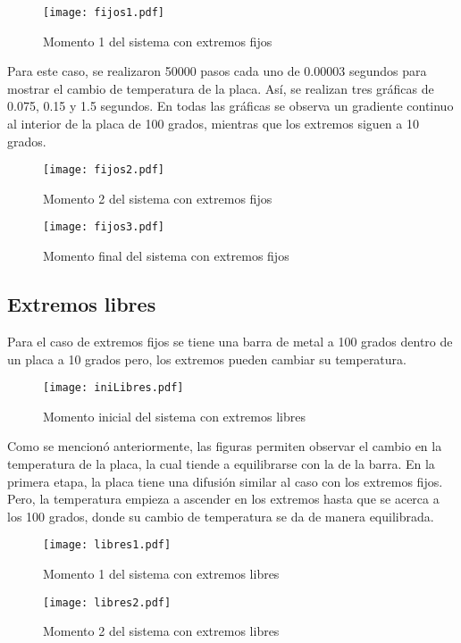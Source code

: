 \documentclass[letterpaper,12pt]{article}
\begin{document}
\begin{figure}[h!]
	\centering
	\caption{Momento 1 del sistema con extremos fijos}
	\texttt{[image: fijos1.pdf]}
\end{figure}

Para este caso, se realizaron 50000 pasos cada uno de 0.00003 segundos para mostrar el cambio de temperatura de la placa. Así, se realizan tres gráficas de 0.075, 0.15 y 1.5 segundos. En todas las gráficas se observa un gradiente continuo al interior de la placa de 100 grados, mientras que los extremos siguen a 10 grados.

\begin{figure}[h!]
	\centering
	\caption{Momento 2 del sistema con extremos fijos}
	\texttt{[image: fijos2.pdf]}
\end{figure}

\begin{figure}[h!]
	\centering
	\caption{Momento final del sistema con extremos fijos}
	\texttt{[image: fijos3.pdf]}
\end{figure}

\subsection*{Extremos libres}

Para el caso de extremos fijos se tiene una barra de metal a 100 grados dentro de un placa a 10 grados pero, los extremos pueden cambiar su temperatura.

\begin{figure}[h!]
	\centering
	\caption{Momento inicial del sistema con extremos libres}
	\texttt{[image: iniLibres.pdf]}
\end{figure}

Como se mencionó anteriormente, las figuras permiten observar el cambio en la temperatura de la placa, la cual tiende a equilibrarse con la de la barra. En la primera etapa, la placa tiene una difusión similar al caso con los extremos fijos. Pero, la temperatura empieza a ascender en los extremos hasta que se acerca a los 100 grados, donde su cambio de temperatura se da de manera equilibrada.

\begin{figure}[h!]
	\centering
	\caption{Momento 1 del sistema con extremos libres}
	\texttt{[image: libres1.pdf]}
\end{figure}

\begin{figure}[h!]
	\centering
	\caption{Momento 2 del sistema con extremos libres}
	\texttt{[image: libres2.pdf]}
\end{figure}
\end{document}
